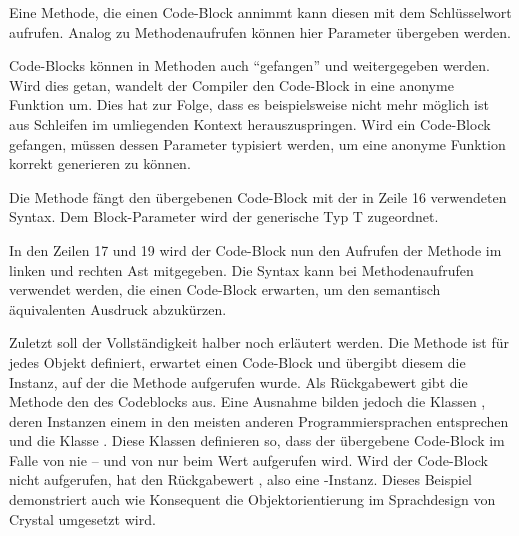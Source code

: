 Eine Methode, die einen Code-Block annimmt kann diesen mit dem Schlüsselwort
 aufrufen.  Analog zu Methodenaufrufen können hier Parameter
übergeben werden.

Code-Blocks können in Methoden auch \enquote{gefangen} und weitergegeben werden.
Wird dies getan, wandelt der Compiler den Code-Block in eine anonyme Funktion
um.  Dies hat zur Folge, dass es beispielsweise nicht mehr möglich ist aus
Schleifen im umliegenden Kontext herauszuspringen.  Wird ein Code-Block
gefangen, müssen dessen Parameter typisiert werden, um eine anonyme Funktion
korrekt generieren zu können.

Die Methode  fängt den übergebenen Code-Block mit der in Zeile 16
verwendeten Syntax.  Dem Block-Parameter wird der generische Typ T
zugeordnet.

In den Zeilen 17 und 19 wird der Code-Block nun den Aufrufen der Methode
 im linken und rechten Ast mitgegeben.  Die Syntax
 kann bei Methodenaufrufen verwendet werden, die
einen Code-Block erwarten, um den semantisch äquivalenten Ausdruck
 abzukürzen.

Zuletzt soll der Vollständigkeit halber noch  erläutert werden.  Die
Methode  ist für jedes Objekt definiert, erwartet einen Code-Block und
übergibt diesem die Instanz, auf der die Methode aufgerufen wurde.  Als
Rückgabewert gibt die Methode den des Codeblocks aus.  Eine Ausnahme bilden
jedoch die Klassen , deren Instanzen einem  in den meisten
anderen Programmiersprachen entsprechen und die Klasse .  Diese
Klassen definieren  so, dass der übergebene Code-Block im Falle von
 nie -- und von  nur beim Wert  aufgerufen
wird.  Wird der Code-Block nicht aufgerufen, hat  den Rückgabewert
, also eine -Instanz.  Dieses Beispiel demonstriert auch wie
Konsequent die Objektorientierung im Sprachdesign von  Crystal umgesetzt wird.

